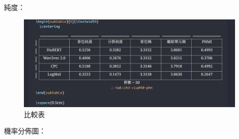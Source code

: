 純度：
{

\begin{figure}
    \centering
    \includegraphics[width=1\linewidth]{figures/000.png}
    \caption{比較表}
    \label{fig:enter-label}
\end{figure}

}
機率分佈圖：
